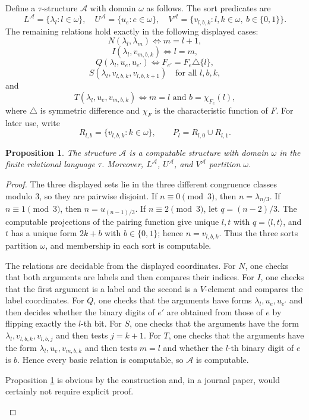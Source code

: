 \documentclass[12pt]{article}
\newtheorem{proposition}[theorem]{Proposition}
\theoremstyle{definition}
\theoremstyle{remark}
\newcommand{\review}[1]{\begin{reviewbox}#1\end{reviewbox}}
\begin{document}
Define a \(\tau\)-structure \(\mathcal A\) with domain \(\omega\) as follows.  The sort predicates are
\[
L^{\mathcal A}=\{\lambda_l:l\in\omega\},\quad
U^{\mathcal A}=\{u_e:e\in\omega\},\quad
V^{\mathcal A}=\{v_{l,b,k}:l,k\in\omega,\ b\in\{0,1\}\}.
\]
The remaining relations hold exactly in the following displayed cases:
\[
N(\lambda_l,\lambda_m)\Longleftrightarrow m=l+1,
\]
\[
I(\lambda_l,v_{m,b,k})\Longleftrightarrow l=m,
\]
\[
Q(\lambda_l,u_e,u_{e'})\Longleftrightarrow F_{e'}=F_e\triangle\{l\},
\]
\[
S(\lambda_l,v_{l,b,k},v_{l,b,k+1})
\quad\text{for all }l,b,k,
\]
and
\[
T(\lambda_l,u_e,v_{m,b,k})
\Longleftrightarrow
m=l\text{ and }b=\chi_{F_e}(l),
\]
where \(\triangle\) is symmetric difference and \(\chi_F\) is the characteristic function of \(F\).  For later use, write
\[
R_{l,b}=\{v_{l,b,k}:k\in\omega\},
\qquad
P_l=R_{l,0}\cup R_{l,1}.
\]

\begin{proposition}\label{prop:construction}
The structure \(\mathcal A\) is a computable structure with domain \(\omega\) in the finite relational language \(\tau\).  Moreover, \(L^{\mathcal A}\), \(U^{\mathcal A}\), and \(V^{\mathcal A}\) partition \(\omega\).
\end{proposition}

\begin{proof}
The three displayed sets lie in the three different congruence classes modulo \(3\), so they are pairwise disjoint.  If \(n\equiv 0\pmod 3\), then \(n=\lambda_{n/3}\).  If \(n\equiv 1\pmod 3\), then \(n=u_{(n-1)/3}\).  If \(n\equiv 2\pmod 3\), let \(q=(n-2)/3\).  The computable projections of the pairing function give unique \(l,t\) with \(q=\langle l,t\rangle\), and \(t\) has a unique form \(2k+b\) with \(b\in\{0,1\}\); hence \(n=v_{l,b,k}\).  Thus the three sorts partition \(\omega\), and membership in each sort is computable.

The relations are decidable from the displayed coordinates.  For \(N\), one checks that both arguments are labels and then compares their indices.  For \(I\), one checks that the first argument is a label and the second is a \(V\)-element and compares the label coordinates.  For \(Q\), one checks that the arguments have forms \(\lambda_l,u_e,u_{e'}\) and then decides whether the binary digits of \(e'\) are obtained from those of \(e\) by flipping exactly the \(l\)-th bit.  For \(S\), one checks that the arguments have the form \(\lambda_l,v_{l,b,k},v_{l,b,j}\) and then tests \(j=k+1\).  For \(T\), one checks that the arguments have the form \(\lambda_l,u_e,v_{m,b,k}\) and then tests \(m=l\) and whether the \(l\)-th binary digit of \(e\) is \(b\).  Hence every basic relation is computable, so \(\mathcal A\) is computable.

\review{Proposition \ref{prop:construction} is obvious by the construction and, in a journal paper, would certainly not require explicit proof.}

\end{proof}
\end{document}
